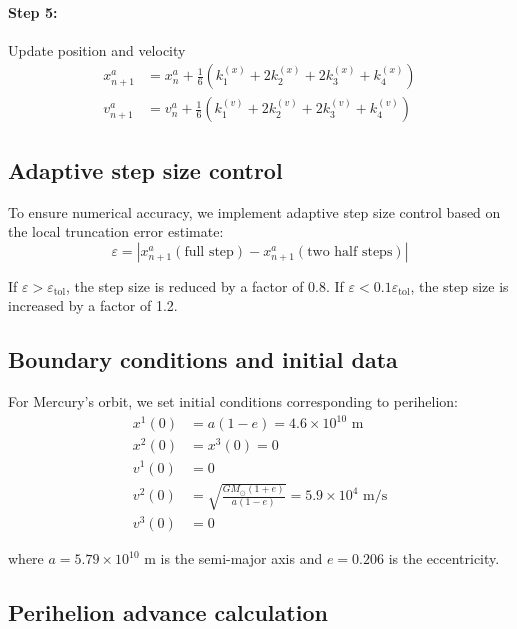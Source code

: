 \paragraph{Step 5:} Update position and velocity
\begin{align}
x^a_{n+1} &= x^a_n + \frac{1}{6}\left(k_1^{(x)} + 2k_2^{(x)} + 2k_3^{(x)} + k_4^{(x)}\right) \\
v^a_{n+1} &= v^a_n + \frac{1}{6}\left(k_1^{(v)} + 2k_2^{(v)} + 2k_3^{(v)} + k_4^{(v)}\right)
\end{align}

\subsection{Adaptive step size control}

To ensure numerical accuracy, we implement adaptive step size control based on the local truncation error estimate:
\begin{equation}
\varepsilon = \left| x^a_{n+1}(\text{full step}) - x^a_{n+1}(\text{two half steps}) \right|
\end{equation}

If $\varepsilon > \varepsilon_{\text{tol}}$, the step size is reduced by a factor of 0.8. If $\varepsilon < 0.1 \varepsilon_{\text{tol}}$, the step size is increased by a factor of 1.2.

\subsection{Boundary conditions and initial data}

For Mercury's orbit, we set initial conditions corresponding to perihelion:
\begin{align}
x^1(0) &= a(1-e) = 4.6 \times 10^{10} \text{ m} \\
x^2(0) &= x^3(0) = 0 \\
v^1(0) &= 0 \\
v^2(0) &= \sqrt{\frac{GM_\odot(1+e)}{a(1-e)}} = 5.9 \times 10^4 \text{ m/s} \\
v^3(0) &= 0
\end{align}

where $a = 5.79 \times 10^{10}$ m is the semi-major axis and $e = 0.206$ is the eccentricity.

\subsection{Perihelion advance calculation}

